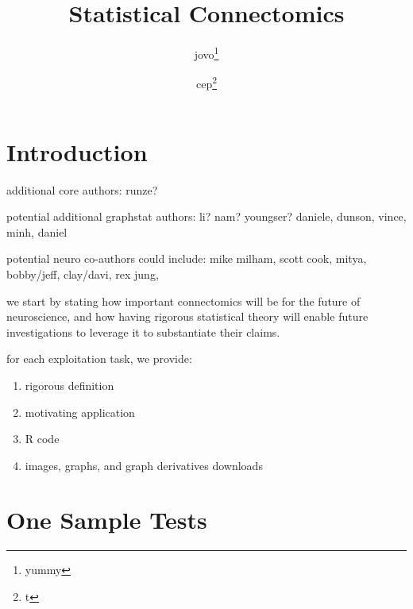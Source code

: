 \documentclass[final,leqno]{article}
\title{\vspace{-50pt}Statistical Connectomics}
\author{jovo\thanks{yummy}
        \and cep\thanks{t}}
\begin{document}
\maketitle
\tableofcontents

\begin{abstract}
\end{abstract}



\pagestyle{myheadings}
\thispagestyle{plain}

\clearpage
\section{Introduction}

additional core authors: runze? 

potential additional graphstat authors: li? nam? youngser? daniele, dunson, vince,  minh, daniel

potential neuro co-authors could include: 
mike milham, scott cook, mitya, bobby/jeff, clay/davi, rex jung, 

we start by stating how important connectomics will be for the future of neuroscience, and how having rigorous statistical theory will enable future investigations to leverage it to substantiate their claims.

for each exploitation task, we provide: 
\begin{enumerate}
\item rigorous definition
\item motivating application
\item R code
\item images, graphs, and graph derivatives downloads
\end{enumerate}


\section{One Sample Tests}
\end{document}
